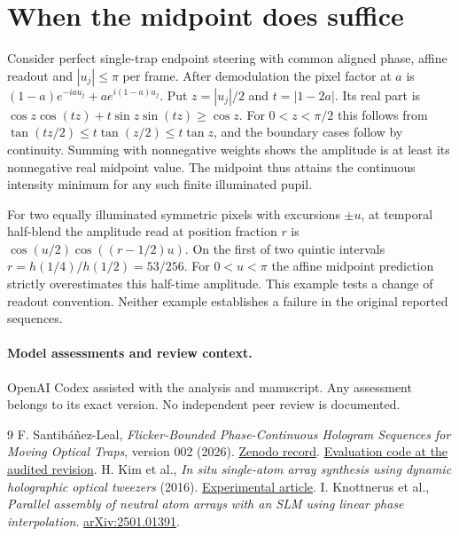 \documentclass[11pt]{article}
\begin{document}
\section{When the midpoint does suffice}
Consider perfect single-trap endpoint steering with common aligned phase, affine readout and $|u_j|\le\pi$ per frame. After demodulation the pixel factor at $a$ is $(1-a)e^{-iau_j}+a e^{i(1-a)u_j}$. Put $z=|u_j|/2$ and $t=|1-2a|$. Its real part is $\cos z\cos(tz)+t\sin z\sin(tz)\ge\cos z$. For $0<z<\pi/2$ this follows from $\tan(tz/2)\le t\tan(z/2)\le t\tan z$, and the boundary cases follow by continuity. Summing with nonnegative weights shows the amplitude is at least its nonnegative real midpoint value. The midpoint thus attains the continuous intensity minimum for any such finite illuminated pupil.

For two equally illuminated symmetric pixels with excursions $\pm u$, at temporal half-blend the amplitude read at position fraction $r$ is $\cos(u/2)\cos((r-1/2)u)$. On the first of two quintic intervals $r=h(1/4)/h(1/2)=53/256$. For $0<u<\pi$ the affine midpoint prediction strictly overestimates this half-time amplitude. This example tests a change of readout convention. Neither example establishes a failure in the original reported sequences.

\paragraph{Model assessments and review context.} OpenAI Codex assisted with the analysis and manuscript. Any assessment belongs to its exact version. No independent peer review is documented.
\begin{thebibliography}{9}
 F. Santib\'a\~nez-Leal, \emph{Flicker-Bounded Phase-Continuous Hologram Sequences for Moving Optical Traps}, version 002 (2026). \href{https://doi.org/10.5281/zenodo.24385662}{Zenodo record}. \href{https://github.com/fsantibanezleal/CEFOP_DinHot/blob/743f617919bfb8fd8f35c7365a3dad0e08c11598/manuscripts/flicker-bounded-sequences/data/measure.py}{Evaluation code at the audited revision}.
 H. Kim et al., \emph{In situ single-atom array synthesis using dynamic holographic optical tweezers} (2016). \href{https://pmc.ncbi.nlm.nih.gov/articles/PMC5095563/}{Experimental article}.
 I. Knottnerus et al., \emph{Parallel assembly of neutral atom arrays with an SLM using linear phase interpolation}. \href{https://arxiv.org/abs/2501.01391}{arXiv:2501.01391}.
\end{thebibliography}
\end{document}
